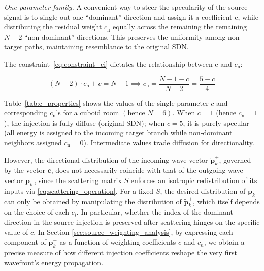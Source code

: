 \documentclass[journal]{IEEEtran}
\begin{document}
\textit{One-parameter family.}
A convenient way to steer the specularity of the source signal is to single out one “dominant” direction and assign it a coefficient c, while distributing the residual weight \(c_{\text{n}}\) equally across the remaining the remaining \(N-2\) “non-dominant” directions. This preserves the uniformity among non-target paths, maintaining resemblance to the original SDN.

The constraint~\eqref{eq:constraint_ci} dictates the relationship between c and \(c_{\text{n}}\):

\begin{equation}
\label{eq:constraint_ci_simplified}
 (N-2) \cdot c_{\text{n}} + c = N-1 \implies c_{\text{n}} = \frac{N-1-c}{N-2} = \frac{5-c}{4}
\end{equation}

Table~\ref{tab:c_properties} shows the values of the single parameter \(c\) and corresponding \(c_{\text{n}}\)'s for a cuboid room \((\text{hence }N=6)\). 
When \(c=1\) (hence \(c_{\text{n}}=1\)), the injection is fully diffuse (original SDN); when \(c=5\), it is purely specular (all energy is assigned to the incoming target branch while non-dominant neighbors assigned $c_{\text{n}}=0$). 
Intermediate values trade diffusion for directionality.

However, the directional distribution of the incoming wave vector $ \mathbf{\tilde p}_k^+$, governed by the vector $\mathbf{c}$, does not necessarily coincide with that of the outgoing wave vector $\mathbf{p}_k^-$, since the scattering matrix $S$ enforces an isotropic redistribution of its inputs via \eqref{eq:scattering_operation}. For a fixed 
$S$, the desired distribution of $\mathbf{p}_k^-$ can only be obtained by manipulating the distribution of $\mathbf{\tilde p}_{k}^{+}$, which itself depends on the choice of each $c_{i}$. In particular, whether the index of the dominant direction in the source injection is preserved after scattering hinges on the specific value of $c$. In Section \ref{sec:source_weighting_analysis}, by expressing each component of $\mathbf{p}_k^-$ as a function of weighting coefficients $c$ and $c_{n}$, we obtain a precise measure of how different injection coefficients reshape the very first wavefront’s energy propagation. 
\end{document}
